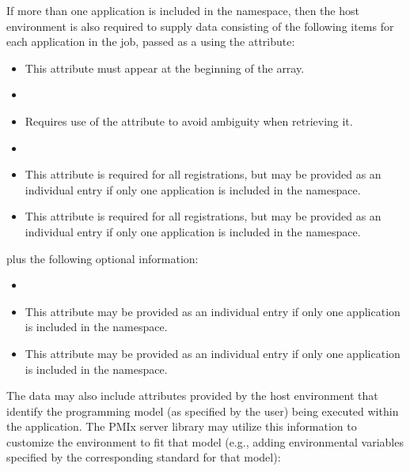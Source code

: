 If more than one application is included in the namespace, then the host environment is also required to supply data consisting of the following items for each application in the job, passed as a  using the  attribute:

\begin{itemize}
    \item {}This attribute must appear at the beginning of the array.
    \pasteAttributeItemEnd
    \item {}
    \item {}Requires use of the  attribute to avoid ambiguity when retrieving it.
    \pasteAttributeItemEnd
    \item {}
    \item {}This attribute is required for all registrations, but may be provided as an individual  entry if only one application is included in the namespace.
    \pasteAttributeItemEnd
    \item {}This attribute is required for all registrations, but may be provided as an individual  entry if only one application is included in the namespace.
    \pasteAttributeItemEnd
\end{itemize}

plus the following optional information:

\begin{itemize}
    \item {}
    \item {}This attribute may be provided as an individual  entry if only one application is included in the namespace.
    \pasteAttributeItemEnd
    \item {}This attribute may be provided as an individual  entry if only one application is included in the namespace.
    \pasteAttributeItemEnd
\end{itemize}

The data may also include attributes provided by the host environment that identify the programming model (as specified by the user) being executed within the application. The \ac{PMIx} server library may utilize this information to customize the environment to fit that model (e.g., adding environmental variables specified by the corresponding standard for that model):

